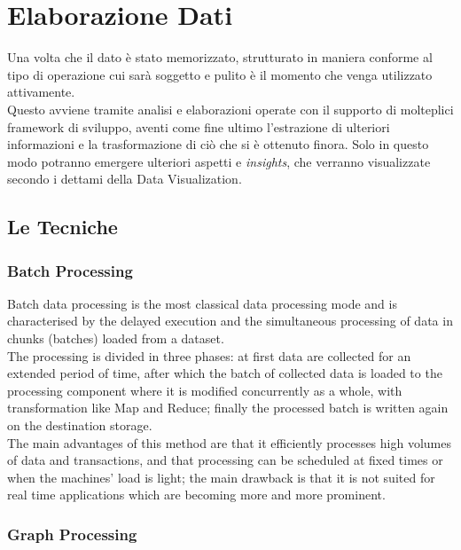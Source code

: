 \chapter{Elaborazione Dati}

Una volta che il dato è stato memorizzato, strutturato in maniera conforme al tipo di operazione cui sarà soggetto e pulito è il momento che venga utilizzato attivamente.\\
Questo avviene tramite analisi e elaborazioni operate con il supporto di molteplici framework di sviluppo, aventi come fine ultimo l'estrazione di ulteriori informazioni e la trasformazione di ciò che si è ottenuto finora. Solo in questo modo potranno emergere ulteriori aspetti e \textit{insights}, che verranno visualizzate secondo i dettami della Data Visualization.\\

\section{Le Tecniche}

\subsection{Batch Processing} \label{BatchProc}
Batch data processing is the most classical data processing mode and is characterised by the delayed execution and the simultaneous processing of data in chunks (batches) loaded from a dataset.
\\
\newline
The processing is divided in three phases: at first data are collected for an extended period of time, after which the batch of collected data is loaded to the processing component where it is modified concurrently as a whole, with transformation like Map and Reduce; finally the processed batch is written again on the destination storage.
\newline
\\
The main advantages of this method are that it efficiently processes high volumes of data and transactions, and that processing can be scheduled at fixed times or when the machines' load is light; the main drawback is that it is not suited for real time applications which are becoming more and more prominent.

\subsection{Graph Processing} \label{GraphProc}

